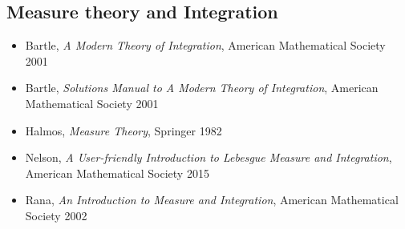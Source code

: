 \subsection*{Measure theory and Integration}

\begin{itemize}
\item Bartle, \textit{A Modern Theory of Integration}, American Mathematical Society 2001
\item Bartle, \textit{Solutions Manual to A Modern Theory of Integration}, American Mathematical Society 2001
\item Halmos, \textit{Measure Theory}, Springer 1982
\item Nelson, \textit{A User-friendly Introduction to Lebesgue Measure and Integration}, American Mathematical Society 2015
\item Rana, \textit{An Introduction to Measure and Integration}, American Mathematical Society 2002
\end{itemize}





